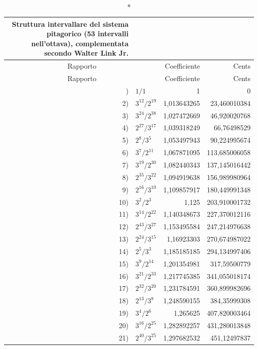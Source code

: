 {\footnotesize
\begin{longtable}{r @{\;} l r r}
  \caption*{Struttura intervallare del sistema pitagorico
    (53 intervalli nell'ottava),
    complementata secondo Walter Link Jr.} \\
  \toprule
  \multicolumn{2}{c}{Rapporto} & Coefficiente & Cents \\
  \midrule
  \endfirsthead
  \toprule
  \multicolumn{2}{c}{Rapporto} & Coefficiente & Cents \\
  \midrule
  \endhead
  \midrule
  \endfoot
  \bottomrule
  \endlastfoot
    1)  & $1/1$           & 1             & 0 \\
    2)  & $3^{12}/2^{19}$ & 1,013643265   & 23,460010384 \\
    3)  & $3^{24}/2^{38}$ & 1,027472669   & 46,920020768 \\
    4)  & $2^{27}/3^{17}$ & 1,039318249   & 66,76498529 \\
    5)  & $2^{8}/3^{5}$   & 1,053497943   & 90,224995674 \\
    6)  & $3^{7}/2^{11}$  & 1,067871095   & 113,685006058 \\
    7)  & $3^{19}/2^{30}$ & 1,082440343   & 137,145016442 \\
    8)  & $2^{35}/3^{22}$ & 1,094919638   & 156,989980964 \\
    9)  & $2^{16}/3^{10}$ & 1,109857917   & 180,449991348 \\
    10) & $3^{2}/2^{3}$   & 1,125         & 203,910001732 \\
    11) & $3^{14}/2^{22}$ & 1,140348673   & 227,370012116 \\
    12) & $2^{43}/3^{27}$ & 1,153495584   & 247,214976638 \\
    13) & $2^{24}/3^{15}$ & 1,16923303    & 270,674987022 \\
    14) & $2^{5}/3^{3}$   & 1,185185185   & 294,134997406 \\
    15) & $3^{9}/2^{14}$  & 1,201354981   & 317,59500779 \\
    16) & $3^{21}/2^{33}$ & 1,217745385   & 341,055018174 \\
    17) & $2^{32}/3^{20}$ & 1,231784591   & 360,899982696 \\
    18) & $2^{13}/3^{8}$  & 1,248590155   & 384,35999308 \\
    19) & $3^{4}/2^{6}$   & 1,265625      & 407,820003464 \\
    20) & $3^{16}/2^{25}$ & 1,282892257   & 431,280013848 \\
    21) & $2^{40}/3^{25}$ & 1,297682532   & 451,12497837 \\

\end{longtable}}
